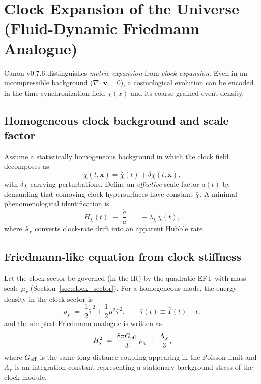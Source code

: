 \documentclass[10pt]{article}
\newcommand{\divop}{\nabla\cdot}
\begin{document}
    \section{Clock Expansion of the Universe (Fluid-Dynamic Friedmann Analogue)}
    \label{sec:cosmo_clock_expansion}

Canon v0.7.6 distinguishes \emph{metric expansion} from \emph{clock expansion}.
Even in an incompressible background ($\divop \mathbf{v}=0$), a cosmological
evolution can be encoded in the time-synchronization field $\chi(x)$ and its
coarse-grained event density.

\subsection{Homogeneous clock background and scale factor}

Assume a statistically homogeneous background in which the clock field decomposes as
\begin{equation}
    \chi(t,\mathbf{x}) = \bar{\chi}(t) + \delta\chi(t,\mathbf{x}),
\end{equation}
with $\delta\chi$ carrying perturbations. Define an \emph{effective} scale factor
$a(t)$ by demanding that comoving clock hypersurfaces have constant $\bar{\chi}$.
A minimal phenomenological identification is
\begin{equation}
    H_\chi(t) \;\equiv\; \frac{\dot{a}}{a} \;=\; -\lambda_\chi\,\dot{\bar{\chi}}(t),
    \label{eq:Hchi_def}
\end{equation}
where $\lambda_\chi$ converts clock-rate drift into an apparent Hubble rate.

\subsection{Friedmann-like equation from clock stiffness}

Let the clock sector be governed (in the IR) by the quadratic EFT with mass scale
$\mu_\tau$ (Section~\ref{sec:clock_sector}). For a homogeneous mode, the energy density
in the clock sector is
\begin{equation}
    \rho_\chi \;=\; \frac{1}{2}\dot{\bar{\tau}}^{\,2} + \frac{1}{2}\mu_\tau^2\bar{\tau}^{\,2},
    \qquad
    \bar{\tau}(t)\equiv \bar{T}(t)-t,
\end{equation}
and the simplest Friedmann analogue is written as
\begin{equation}
    H_\chi^2 \;=\; \frac{8\pi G_{\rm eff}}{3}\,\rho_\chi \;+\; \frac{\Lambda_\chi}{3},
    \label{eq:friedmann_clock}
\end{equation}
where $G_{\rm eff}$ is the same long-distance coupling appearing in the Poisson limit
and $\Lambda_\chi$ is an integration constant representing a stationary background
stress of the clock module.
\end{document}
